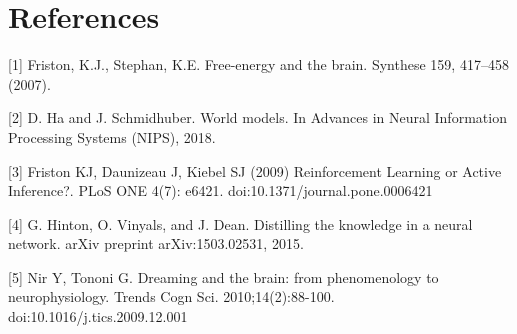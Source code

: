 \documentclass{article}
\begin{document}





\section*{References}

\small

[1] Friston, K.J., Stephan, K.E. Free-energy and the brain. Synthese 159, 417–458 (2007). 

[2] D. Ha and J. Schmidhuber. World models. In Advances in Neural Information Processing Systems (NIPS), 2018.

[3] Friston KJ, Daunizeau J, Kiebel SJ (2009) Reinforcement Learning or Active Inference?. PLoS ONE 4(7): e6421. doi:10.1371/journal.pone.0006421

[4] G. Hinton, O. Vinyals, and J. Dean. Distilling the knowledge in a neural network. arXiv preprint arXiv:1503.02531, 2015.

[5] Nir Y, Tononi G. Dreaming and the brain: from phenomenology to neurophysiology. Trends Cogn Sci. 2010;14(2):88-100. doi:10.1016/j.tics.2009.12.001


\vspace{2cm}


\end{document}

